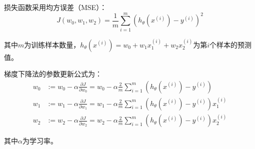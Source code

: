 \documentclass[a4paper]{article}
\begin{document}
损失函数采用均方误差（MSE）：
$$J(w_0, w_1, w_2) = \frac{1}{m} \sum_{i=1}^{m} (h_\theta(x^{(i)}) - y^{(i)})^2$$

其中$m$为训练样本数量，$h_\theta(x^{(i)}) = w_0 + w_1 x_1^{(i)} + w_2 x_2^{(i)}$为第$i$个样本的预测值。

梯度下降法的参数更新公式为：
\begin{align}
w_0 &:= w_0 - \alpha \frac{\partial J}{\partial w_0} = w_0 - \alpha \frac{2}{m} \sum_{i=1}^{m} (h_\theta(x^{(i)}) - y^{(i)}) \\
w_1 &:= w_1 - \alpha \frac{\partial J}{\partial w_1} = w_1 - \alpha \frac{2}{m} \sum_{i=1}^{m} (h_\theta(x^{(i)}) - y^{(i)}) x_1^{(i)} \\
w_2 &:= w_2 - \alpha \frac{\partial J}{\partial w_2} = w_2 - \alpha \frac{2}{m} \sum_{i=1}^{m} (h_\theta(x^{(i)}) - y^{(i)}) x_2^{(i)}
\end{align}

其中$\alpha$为学习率。
\end{document}
